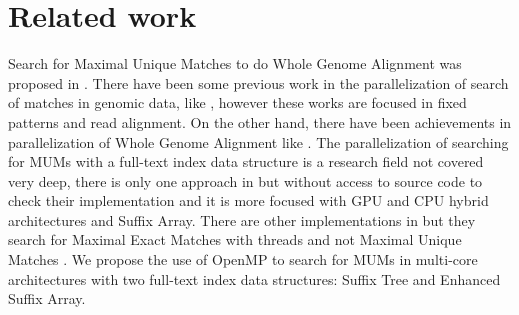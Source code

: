 \documentclass[runningheads,a5paper]{llncs}
\begin{document}
\section{Related work}
Search for Maximal Unique Matches to do Whole Genome Alignment was proposed in \cite{Delcher1999}. There have been some previous work in the parallelization of search of matches in genomic data, like \cite{OguzhanKulekci2011,Mongelli,Kouzinopoulos2005}, however these works are focused in fixed patterns and read alignment. On the other hand, there have been achievements in parallelization of Whole Genome Alignment like \cite{Meng2005}. The parallelization of searching for MUMs with a full-text index data structure is a research field not covered very deep, there is only one approach in \cite{Encarnac2011} but without access to source code to check their implementation and it is more focused with GPU and CPU hybrid architectures and Suffix Array. There are other implementations in \cite{Vyverman2013,OguzhanKulekci2011,Khan2009,OhlebuschGK10} but they search for Maximal Exact Matches with threads and not Maximal Unique Matches . We propose the use of OpenMP to search for MUMs in multi-core architectures with two full-text index data structures: Suffix Tree and Enhanced Suffix Array.
\end{document}
